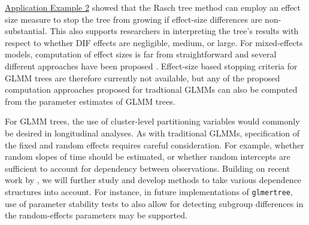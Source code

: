 \documentclass[doc,floatsintext,natbib]{apa7}
\begin{document}
\hyperref[sec:TutorialRasch]{Application Example 2} showed that the Rasch tree method can employ an effect size measure to stop the tree from growing if effect-size differences are non-substantial. This also supports researchers in interpreting the tree's results with respect to whether DIF effects are negligible, medium, or large. For mixed-effects models, computation of effect sizes is far from straightforward and several different approaches have been proposed \citep[e.g., ][]{JuddyWest17, BrysyStev18, Bran18}. Effect-size based stopping criteria for GLMM trees are therefore currently not available, but any of the proposed computation approaches proposed for tradtional GLMMs can also be computed from the parameter estimates of GLMM trees.



For GLMM trees, the use of cluster-level partitioning variables would commonly be desired in longitudinal analyses. As with traditional GLMMs, specification of the fixed and random effects requires careful consideration. For example, whether random slopes of time should be estimated, or whether random intercepts are sufficient to account for dependency between observations. Building on recent work by \citet{FokkyZeil23}, we will further study and develop methods to take various dependence structures into account. For instance, in future implementations of \texttt{glmertree}, use of parameter stability tests to also allow for detecting subgroup differences in the random-effects parameters \citep{Wang2021a} may be supported.

\end{document}

